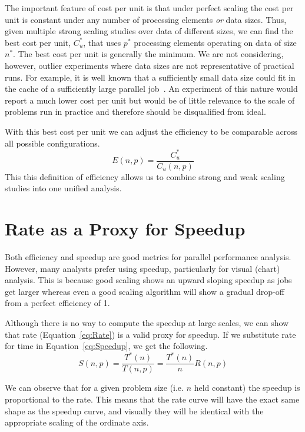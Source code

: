 \documentclass{llncs}
\newcommand*{\lcite}[1]{~\cite{#1}}
\begin{document}
The important feature of cost per unit is that under perfect scaling the
cost per unit is constant under any number of processing elements \emph{or}
data sizes. Thus, given multiple strong scaling studies over data of
different sizes, we can find the best cost per unit, $C_u^*$, that uses
$p^*$ processing elements operating on data of size $n^*$. The best cost
per unit is generally the minimum. We are not considering, however, outlier
experiments where data sizes are not representative of practical runs. For
example, it is well known that a sufficiently small data size could fit in
the cache of a sufficiently large parallel job\lcite{Gustafson1990}. An
experiment of this nature would report a much lower cost per unit but would
be of little relevance to the scale of problems run in practice and
therefore should be disqualified from ideal.

With this best
cost per unit we can adjust the efficiency to be comparable across all
possible configurations.
\begin{equation}
  E(n,p) = \frac{C_u^*}{C_u(n,p)}
  \label{eq:EfficiencyCostPerUnit}
\end{equation}
This this definition of efficiency allows us to combine strong and weak
scaling studies into one unified analysis.

\section{Rate as a Proxy for Speedup}
\label{sec:RateProxy}

\noindent
Both efficiency and speedup are good metrics for parallel performance
analysis. However, many analysts prefer using speedup, particularly for
visual (chart) analysis. This is because good scaling shows an upward
sloping speedup as jobs get larger whereas even a good scaling algorithm
will show a gradual drop-off from a perfect efficiency of 1.

Although there is no way to compute the speedup at large scales, we can
show that rate (Equation~\ref{eq:Rate}) is a valid proxy for speedup. If we
substitute rate for time in Equation~\ref{eq:Speedup}, we get the
following.
\begin{equation}
  S(n,p) = \frac{T^*(n)}{T(n,p)} = \frac{T^*(n)}{n} R(n,p)
  \label{eq:SpeedupFromRate}
\end{equation}

We can observe that for a given problem size (i.e. $n$ held constant) the
speedup is proportional to the rate. This means that the rate curve will
have the exact same shape as the speedup curve, and visually they will be
identical with the appropriate scaling of the ordinate axis.
\end{document}

